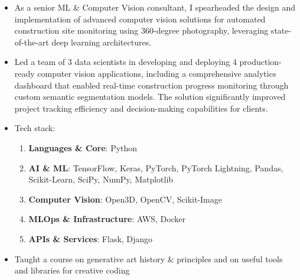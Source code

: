 {  
  \begin{itemize}
    \item As a senior ML \& Computer Vision consultant, I spearheaded the design and implementation of advanced computer vision solutions for automated construction site monitoring using 360-degree photography, leveraging state-of-the-art deep learning architectures.
    \item Led a team of 3 data scientists in developing and deploying 4 production-ready computer vision applications, including a comprehensive analytics dashboard that enabled real-time construction progress monitoring through custom semantic segmentation models. The solution significantly improved project tracking efficiency and decision-making capabilities for clients.
    \item Tech stack:
      \begin{enumerate}
        \item \textbf{Languages \& Core}: {\color{accent2}Python}
        \item \textbf{AI \& ML}: {\color{accent2}TensorFlow, Keras, PyTorch, PyTorch Lightning, Pandas, Scikit-Learn, SciPy, NumPy, Matplotlib}
        \item \textbf{Computer Vision}: {\color{accent2}Open3D, OpenCV, Scikit-Image}
        \item \textbf{MLOps \& Infrastructure}: {\color{accent2}AWS, Docker}
        \item \textbf{APIs \& Services}: {\color{accent2}Flask, Django}
      \end{enumerate}
  \end{itemize}

  \divider

  \begin{itemize}
    \item Taught a course on generative art history \& principles and on useful tools and libraries for creative coding
  \end{itemize}

  \divider

}
